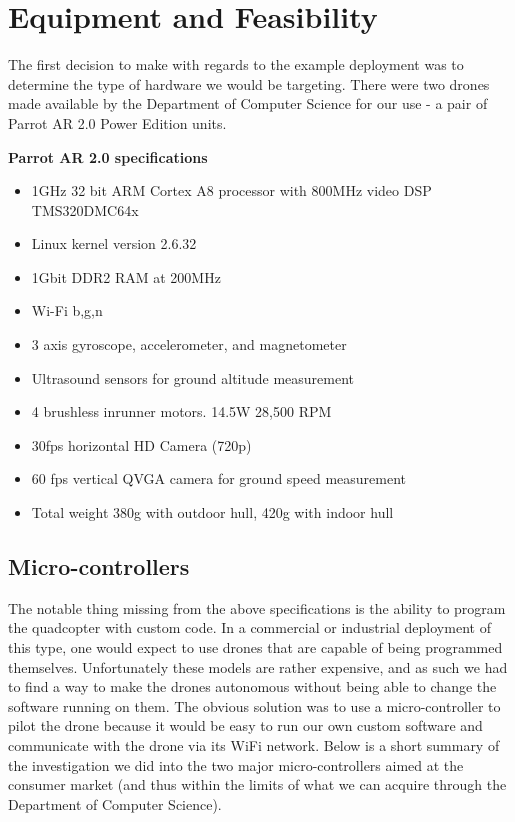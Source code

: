 \section{Equipment and Feasibility}
The first decision to make with regards to the example deployment was to determine the type of hardware we would be targeting. There were two drones made available by the Department of Computer Science for our use - a pair of Parrot AR 2.0 Power Edition units.

\begin{aside}
\textbf{Parrot AR 2.0 specifications\cite{parrotspecs}}
\begin{itemize}
\item 1GHz 32 bit ARM Cortex A8 processor with 800MHz video DSP TMS320DMC64x
\item Linux kernel version 2.6.32
\item 1Gbit DDR2 RAM at 200MHz
\item Wi-Fi b,g,n
\item 3 axis gyroscope, accelerometer, and magnetometer
\item Ultrasound sensors for ground altitude measurement
\item 4 brushless inrunner motors. 14.5W 28,500 RPM
\item 30fps horizontal HD Camera (720p)
\item 60 fps vertical QVGA camera for ground speed measurement
\item Total weight 380g with outdoor hull, 420g with indoor hull
\end{itemize}
\end{aside}

\subsection{Micro-controllers}
The notable thing missing from the above specifications is the ability to program the quadcopter with custom code. In a commercial or industrial deployment of this type, one would expect to use drones that are capable of being programmed themselves. Unfortunately these models are rather expensive, and as such we had to find a way to make the drones autonomous without being able to change the software running on them. The obvious solution was to use a micro-controller to pilot the drone because it would be easy to run our own custom software and communicate with the drone via its WiFi network. Below is a short summary of the investigation we did into the two major micro-controllers aimed at the consumer market (and thus within the limits of what we can acquire through the Department of Computer Science).

